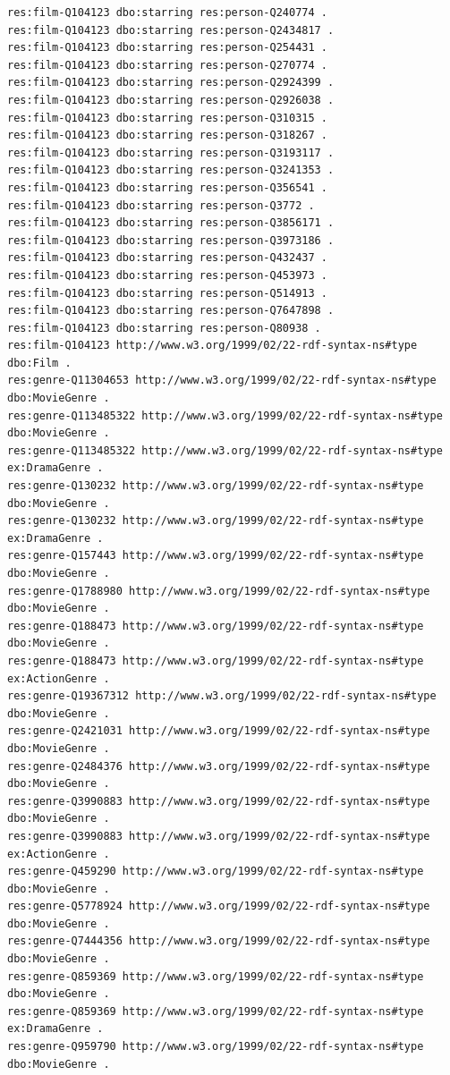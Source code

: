 \documentclass[
  11pt,
]{article}
\begin{document}
\begin{verbatim}
res:film-Q104123 dbo:starring res:person-Q240774 .
res:film-Q104123 dbo:starring res:person-Q2434817 .
res:film-Q104123 dbo:starring res:person-Q254431 .
res:film-Q104123 dbo:starring res:person-Q270774 .
res:film-Q104123 dbo:starring res:person-Q2924399 .
res:film-Q104123 dbo:starring res:person-Q2926038 .
res:film-Q104123 dbo:starring res:person-Q310315 .
res:film-Q104123 dbo:starring res:person-Q318267 .
res:film-Q104123 dbo:starring res:person-Q3193117 .
res:film-Q104123 dbo:starring res:person-Q3241353 .
res:film-Q104123 dbo:starring res:person-Q356541 .
res:film-Q104123 dbo:starring res:person-Q3772 .
res:film-Q104123 dbo:starring res:person-Q3856171 .
res:film-Q104123 dbo:starring res:person-Q3973186 .
res:film-Q104123 dbo:starring res:person-Q432437 .
res:film-Q104123 dbo:starring res:person-Q453973 .
res:film-Q104123 dbo:starring res:person-Q514913 .
res:film-Q104123 dbo:starring res:person-Q7647898 .
res:film-Q104123 dbo:starring res:person-Q80938 .
res:film-Q104123 http://www.w3.org/1999/02/22-rdf-syntax-ns#type dbo:Film .
res:genre-Q11304653 http://www.w3.org/1999/02/22-rdf-syntax-ns#type dbo:MovieGenre .
res:genre-Q113485322 http://www.w3.org/1999/02/22-rdf-syntax-ns#type dbo:MovieGenre .
res:genre-Q113485322 http://www.w3.org/1999/02/22-rdf-syntax-ns#type ex:DramaGenre .
res:genre-Q130232 http://www.w3.org/1999/02/22-rdf-syntax-ns#type dbo:MovieGenre .
res:genre-Q130232 http://www.w3.org/1999/02/22-rdf-syntax-ns#type ex:DramaGenre .
res:genre-Q157443 http://www.w3.org/1999/02/22-rdf-syntax-ns#type dbo:MovieGenre .
res:genre-Q1788980 http://www.w3.org/1999/02/22-rdf-syntax-ns#type dbo:MovieGenre .
res:genre-Q188473 http://www.w3.org/1999/02/22-rdf-syntax-ns#type dbo:MovieGenre .
res:genre-Q188473 http://www.w3.org/1999/02/22-rdf-syntax-ns#type ex:ActionGenre .
res:genre-Q19367312 http://www.w3.org/1999/02/22-rdf-syntax-ns#type dbo:MovieGenre .
res:genre-Q2421031 http://www.w3.org/1999/02/22-rdf-syntax-ns#type dbo:MovieGenre .
res:genre-Q2484376 http://www.w3.org/1999/02/22-rdf-syntax-ns#type dbo:MovieGenre .
res:genre-Q3990883 http://www.w3.org/1999/02/22-rdf-syntax-ns#type dbo:MovieGenre .
res:genre-Q3990883 http://www.w3.org/1999/02/22-rdf-syntax-ns#type ex:ActionGenre .
res:genre-Q459290 http://www.w3.org/1999/02/22-rdf-syntax-ns#type dbo:MovieGenre .
res:genre-Q5778924 http://www.w3.org/1999/02/22-rdf-syntax-ns#type dbo:MovieGenre .
res:genre-Q7444356 http://www.w3.org/1999/02/22-rdf-syntax-ns#type dbo:MovieGenre .
res:genre-Q859369 http://www.w3.org/1999/02/22-rdf-syntax-ns#type dbo:MovieGenre .
res:genre-Q859369 http://www.w3.org/1999/02/22-rdf-syntax-ns#type ex:DramaGenre .
res:genre-Q959790 http://www.w3.org/1999/02/22-rdf-syntax-ns#type dbo:MovieGenre .
\end{verbatim}
\end{document}
